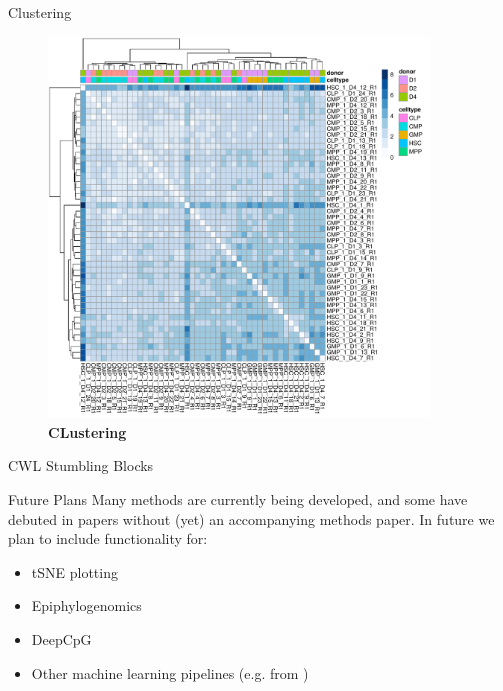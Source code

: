 \documentclass{beamer}
\begin{document}
\begin{frame}
\begin{columns}[t]
\begin{column}{.65\textwidth}
\begin{columns}[t,totalwidth=\textwidth]
\begin{column}{.48\textwidth}
\begin{block}{Clustering}
\begin{figure}
\begin{center}
\includegraphics[width=0.9\textwidth]{figures/farlik_heatmap.pdf}
\caption{\textbf{CLustering} \cite{Farlik2016} }
\end{center}
\end{figure}


\end{block}




\begin{block}{CWL Stumbling Blocks}

\end{block}



\begin{block}{Future Plans}
Many methods are currently being developed, and some have debuted in papers without (yet) an accompanying methods paper. In future we plan to include functionality for:
\begin{itemize}
\item tSNE plotting
\item Epiphylogenomics
\item DeepCpG
\item Other machine learning pipelines (e.g. from \cite{Farlik2016}) 
\end{itemize}


\end{block}
\end{column}
\end{columns}
\end{column}
\end{columns}
\end{frame}
\end{document}
